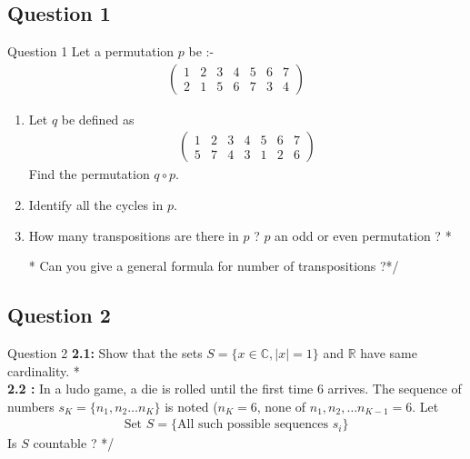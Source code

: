 \documentclass[xcolor=svgnames]{beamer}
\begin{document}
\subsection{Question 1}
\begin{frame}{Question 1}
    Let a permutation $p$ be :- 
    \begin{align*}
        \begin{pmatrix}
        1 & 2 & 3 & 4 & 5 & 6 & 7\\ 2 & 1 & 5 & 6 & 7 & 3 & 4
        \end{pmatrix}
    \end{align*}
    \begin{enumerate}
        \item Let $q$ be defined as 
        \begin{align*}
        \begin{pmatrix}
        1 & 2 & 3 & 4 & 5 & 6 & 7\\ 5 & 7 & 4 & 3 & 1 & 2 & 6
        \end{pmatrix}            
        \end{align*}
        Find the permutation $q \circ p$.    
        \item Identify all the cycles in $p$.
        \item How many transpositions are there in $p$ ? $p$ an odd or even permutation ? 
        \/*\item [*] Can you give a general formula for number of transpositions ?*/
    \end{enumerate}
\end{frame}


\subsection{Question 2}
\begin{frame}{Question 2}
\textbf{2.1:} Show that the sets $S = \{x \in \mathbb{C},  |x| = 1 \}$ and $\mathbb{R}$ have same cardinality.
\/*\\ \textbf{2.2 :} In a ludo game, a die is rolled until the first time $6$ arrives. The sequence of numbers $s_K = \{n_1,n_2 \ldots n_K\}$ is noted ($n_K = 6$, none of $n_1, n_2, \ldots n_{K-1} = 6$. Let 
\begin{align*}
    \text{Set }S = \{ \text{All such possible sequences } s_i \}
\end{align*}
Is $S$ countable ?
*/
\end{frame}
\end{document}
